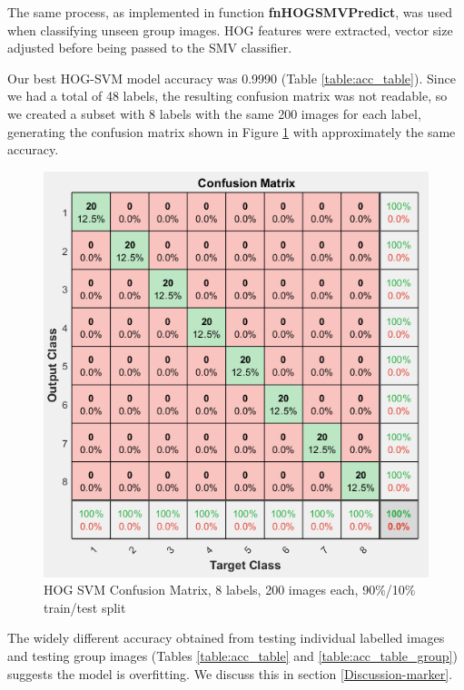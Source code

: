 The same process, as implemented in function \textbf{fnHOGSMVPredict}, was used when classifying unseen group images. HOG features were extracted, vector size adjusted before being passed to the SMV classifier.

Our best HOG-SVM model accuracy was 0.9990 (Table \ref{table:acc_table}). Since we had a total of 48 labels, the resulting confusion matrix was not readable, so we created a subset with 8 labels with the same 200 images for each label, generating the confusion matrix shown in Figure \ref{fig:hog_conf_mat} with approximately the same accuracy. 

\begin{figure}[h]
 \centering 
 \includegraphics[width=\columnwidth]{images/HOG-SVM-Conf-Mat-200-gray-0.9.png}
 \caption{HOG SVM Confusion Matrix, 8 labels, 200 images each, 90\%/10\% train/test split}
 \label{fig:hog_conf_mat}
\end{figure}  
The widely different accuracy obtained from testing individual labelled images and testing group images (Tables \ref{table:acc_table} and \ref{table:acc_table_group}) suggests the model is overfitting. We discuss this in section \ref{Discussion-marker}.


